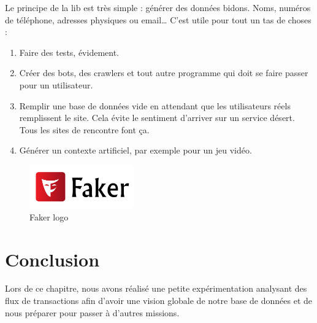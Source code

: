 Le principe de la lib est très simple : générer des données bidons. Noms, numéros de téléphone, adresses physiques ou email… C’est utile pour tout un tas de choses :
\begin{enumerate}[label=$\bullet$]

    \item Faire des tests, évidement.
\item Créer des bots, des crawlers et tout autre programme qui doit se faire passer pour un utilisateur.
\item Remplir une base de données vide en attendant que les utilisateurs réels remplissent le site. Cela évite le sentiment d’arriver sur un service désert. Tous les sites de rencontre font ça.
\item Générer un contexte artificiel, par exemple pour un jeu vidéo.
\end{enumerate}
\begin{figure}[!ht]\centering
\includegraphics[width=0.4\textwidth]{chapitres/chapitre7/figures/faker.png}
\caption{Faker logo }
\label{fig:faker}
\end{figure}
\section*{Conclusion}
Lors de ce chapitre, nous avons r\'ealis\'e une petite expérimentation analysant des flux de transactions afin d'avoir une vision globale de notre base de données et de nous préparer pour passer à d'autres missions.
